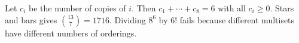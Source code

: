 Let $c_i$ be the number of copies of $i$. Then $c_1+\cdots+c_8=6$ with all $c_i\ge0$. Stars and bars gives $\binom{13}{7}=\boxed{1716}$. Dividing $8^6$ by $6!$ fails because different multisets have different numbers of orderings.
